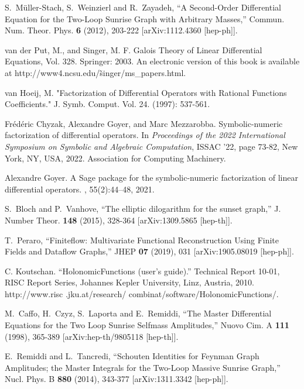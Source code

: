 \documentclass[a4paper,12pt]{article}
\numberwithin{equation}{section}
\numberwithin{figure}{section}
\begin{document}
\begin{thebibliography}{99}
S.~M\"uller-Stach, S.~Weinzierl and R.~Zayadeh,
``A Second-Order Differential Equation for the Two-Loop Sunrise Graph with Arbitrary Masses,''
Commun. Num. Theor. Phys. \textbf{6} (2012), 203-222
[arXiv:1112.4360 [hep-ph]].

  
 van der Put, M., and Singer, M. F. Galois Theory of Linear Differential Equations, Vol. 328. Springer: 2003. An electronic version of this book is available at http://www4.ncsu.edu/\~singer/ms\_papers.html.

  van Hoeij, M. "Factorization of Differential Operators with Rational Functions Coefficients." J. Symb. Comput. Vol. 24. (1997): 537-561.

Fr\'{e}d\'{e}ric Chyzak, Alexandre Goyer, and Marc Mezzarobba.
\newblock Symbolic-numeric factorization of differential operators.
\newblock In {\em Proceedings of the 2022 International Symposium on Symbolic
  and Algebraic Computation}, ISSAC '22, page 73-82, New York, NY, USA, 2022.
Association for Computing Machinery.
\newblock [arXiv:2205.08991]

Alexandre Goyer.
\newblock A {S}age package for the symbolic-numeric factorization of linear
  differential operators.
, 55(2):44--48,
2021.

S.~Bloch and P.~Vanhove,
``The elliptic dilogarithm for the sunset graph,''
J. Number Theor. \textbf{148} (2015), 328-364
[arXiv:1309.5865 [hep-th]].

 
T.~Peraro,
``Finiteflow: Multivariate Functional Reconstruction Using Finite Fields and Dataflow Graphs,''
JHEP \textbf{07} (2019), 031
[arXiv:1905.08019 [hep-ph]].


 C. Koutschan. ``HolonomicFunctions (user's guide).'' Technical Report 10-01, RISC Report Series, Johannes Kepler University, Linz, Austria, 2010. http://www.risc
.jku.at/research/ combinat/software/HolonomicFunctions/.

  
M.~Caffo, H.~Czyz, S.~Laporta and E.~Remiddi,
``The Master Differential Equations for the Two Loop Sunrise Selfmass Amplitudes,''
Nuovo Cim. A \textbf{111} (1998), 365-389
[arXiv:hep-th/9805118 [hep-th]].
  
E.~Remiddi and L.~Tancredi,
``Schouten Identities for Feynman Graph Amplitudes; the Master Integrals for the Two-Loop Massive Sunrise Graph,''
Nucl. Phys. B \textbf{880} (2014), 343-377
[arXiv:1311.3342 [hep-ph]].
  

\end{thebibliography}
\end{document}
